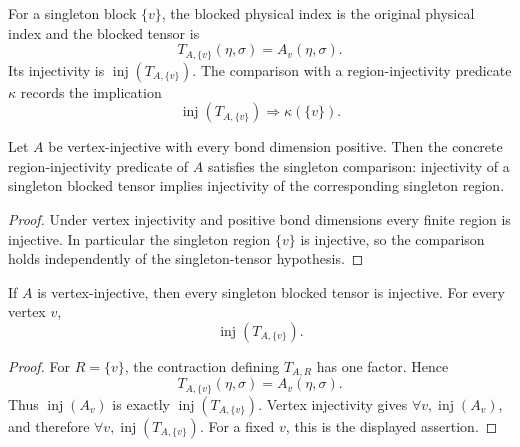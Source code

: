 \begin{definition}%
    \label{def:peps_singletonRegionTensor}
    \leanok
    For a singleton block $\{v\}$, the blocked physical index is the original
    physical index and the blocked tensor is
    \[
        T_{A,\{v\}}(\eta,\sigma)=A_v(\eta,\sigma).
    \]
    Its injectivity is $\operatorname{inj}(T_{A,\{v\}})$. The comparison with a
    region-injectivity predicate $\kappa$ records the implication
    \[
        \operatorname{inj}(T_{A,\{v\}})\Longrightarrow\kappa(\{v\}).
    \]
\end{definition}

\begin{theorem}%
    \label{thm:peps_singletonRegionInjectivityComparison_of_isVertexInjective}
    \leanok
    Let $A$ be vertex-injective with every bond dimension positive. Then the
    concrete region-injectivity predicate of $A$ satisfies the singleton
    comparison: injectivity of a singleton blocked tensor implies injectivity of
    the corresponding singleton region.
\end{theorem}
\begin{proof}\leanok
    Under vertex injectivity and positive bond dimensions every finite region
    is injective. In particular the singleton region $\{v\}$ is injective, so
    the comparison holds independently of the singleton-tensor hypothesis.
\end{proof}

\begin{theorem}%
    \label{thm:peps_singletonRegionTensorInjective}
    \leanok
    If $A$ is vertex-injective, then every singleton blocked tensor is
    injective. For every vertex $v$,
    \[
        \operatorname{inj}(T_{A,\{v\}}).
    \]
\end{theorem}
\begin{proof}\leanok
    For $R=\{v\}$, the contraction defining $T_{A,R}$ has one factor. Hence
    \[
        T_{A,\{v\}}(\eta,\sigma)=A_v(\eta,\sigma).
    \]
    Thus $\operatorname{inj}(A_v)$ is exactly
    $\operatorname{inj}(T_{A,\{v\}})$. Vertex injectivity gives
    $\forall v,\operatorname{inj}(A_v)$, and therefore
    $\forall v,\operatorname{inj}(T_{A,\{v\}})$. For a fixed $v$, this is the
    displayed assertion.
\end{proof}

